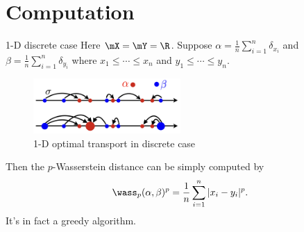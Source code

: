 \section{Computation}

\begin{frame}{1-D discrete case}
    \footnotesize
    Here $\mX=\mY=\R$. Suppose
     $\alpha=\frac{1}{n}\sum_{i=1}^n \delta_{x_i}$
    and $\beta=\frac{1}{n}\sum_{i=1}^n \delta_{y_i}$
    where $x_1\leq \cdots \leq x_n$ and $y_1\leq \cdots \leq y_n$.

    \begin{figure}
        \centering
        \captionsetup{font=scriptsize}
        \includegraphics[width=0.5\textwidth]{png/1d-discrete.png}
        \caption{1-D optimal transport in discrete case}
    \end{figure}
    
    Then the $p$-Wasserstein distance can be simply computed by
    \begin{equation}
        \wass_p(\alpha,\beta)^p = \frac{1}{n}\sum_{i=1}^n |x_i-y_i|^p.
    \end{equation}
    It's in fact a greedy algorithm.
\end{frame}

